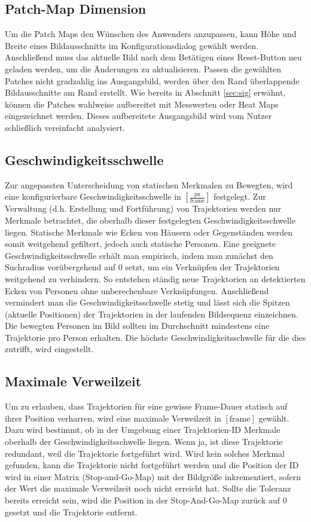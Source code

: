\subsection{Patch-Map Dimension}
Um die Patch Maps den Wünschen des Anwenders anzupassen, kann Höhe und Breite eines Bildausschnitts im Konfigurationsdialog gewählt werden. Anschließend muss das aktuelle Bild nach dem Betätigen eines Reset-Button neu geladen werden, um die Änderungen zu aktualisieren. Passen die gewählten Patches nicht gradzahlig ins Ausgangsbild, werden über den Rand überlappende Bildausschnitte am Rand erstellt. Wie bereits in Abschnitt \ref{sec:sig} erwähnt, können die Patches wahlweise aufbereitet mit Messwerten oder Heat Maps eingezeichnet werden. Dieses aufbereitete Ausgangsbild wird vom Nutzer schließlich vereinfacht analysiert.

\subsection{Geschwindigkeitsschwelle}
Zur angepassten Unterscheidung von statischen Merkmalen zu Bewegten, wird eine konfigurierbare Geschwindigkeitsschwelle in $[\frac{\text{px}}{\text{frame}}]$ festgelegt. Zur Verwaltung (d.h. Erstellung und Fortführung) von Trajektorien werden nur Merkmale betrachtet, die oberhalb dieser festgelegten Geschwindigkeitsschwelle liegen. Statische Merkmale wie Ecken von Häusern oder Gegenständen werden somit weitgehend gefiltert, jedoch auch statische Personen. Eine geeignete Geschwindigkeitsschwelle erhält man empirisch, indem man zunächst den Suchradius vorübergehend auf $0$ setzt, um ein Verknüpfen der Trajektorien weitgehend zu verhindern. So entstehen ständig neue Trajektorien an detektierten Ecken von Personen ohne unberechenbare Verknüpfungen. Anschließend vermindert man die Geschwindigkeitsschwelle stetig und lässt sich die Spitzen (aktuelle Positionen) der Trajektorien in der laufenden Bildsequenz einzeichnen. Die bewegten Personen im Bild sollten im Durchschnitt mindestens eine Trajektorie pro Person erhalten. Die höchste Geschwindigkeitsschwelle für die dies zutrifft, wird eingestellt.

\subsection{Maximale Verweilzeit}
Um zu erlauben, dass Trajektorien für eine gewisse Frame-Dauer statisch auf ihrer Position verharren, wird eine maximale Verweilzeit in $[\text{frame}]$ gewählt. Dazu wird bestimmt, ob in der Umgebung einer Trajektorien-ID Merkmale oberhalb der Geschwindigkeitsschwelle liegen. Wenn ja, ist diese Trajektorie redundant, weil die Trajektorie fortgeführt wird. Wird kein solches Merkmal gefunden, kann die Trajektorie nicht fortgeführt werden und die Position der ID wird in einer Matrix (Stop-and-Go-Map) mit der Bildgröße inkrementiert, sofern der Wert die maximale Verweilzeit noch nicht erreicht hat. Sollte die Toleranz bereits erreicht sein, wird die Position in der Stop-And-Go-Map zurück auf 0 gesetzt und die Trajektorie entfernt.

